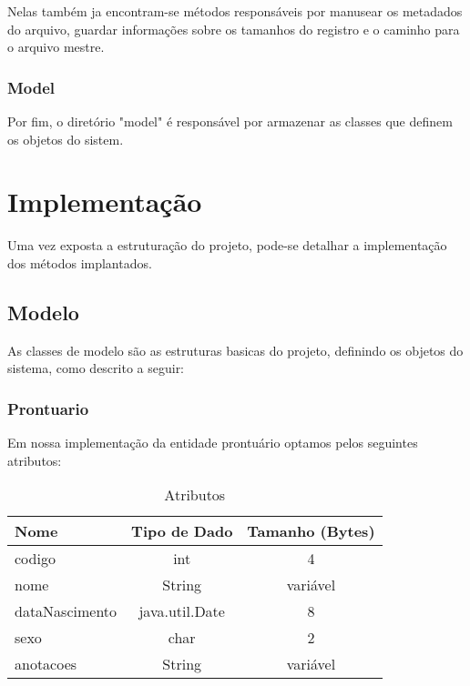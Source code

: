 Nelas também ja encontram-se métodos responsáveis por manusear os metadados do arquivo, guardar informações sobre os tamanhos do registro e o caminho para o arquivo mestre.

\subsubsection{\esp Model}

Por fim, o diretório "model" é responsável por armazenar as classes que definem os objetos do sistem.


\section{\esp Implementação}

Uma vez exposta a estruturação do projeto, pode-se detalhar a implementação dos métodos implantados.

\subsection{\esp Modelo}

As classes de modelo são as estruturas basicas do projeto, definindo os objetos do sistema, como descrito a seguir:


\subsubsection{\esp Prontuario}

Em nossa implementação da entidade prontuário optamos pelos seguintes atributos: 

\begin{table}[htb]
	\centering
	\caption{\hspace{0.1cm} Atributos }
	\vspace{-0.3cm} %
	\label{tab:tabela1}
	\begin{tabular}{l|c|c}
  \hline
    \textbf{Nome}	& \textbf{Tipo de Dado} & \textbf{Tamanho (Bytes)} \\
    \hline
     codigo         & int           & 4 \\
     nome   	    & String        & variável \\
     dataNascimento	& java.util.Date & 8 \\
     sexo           & char          & 2 \\
     anotacoes	    & String        & variável \\
     \hline
 \end{tabular}
\end{table}

